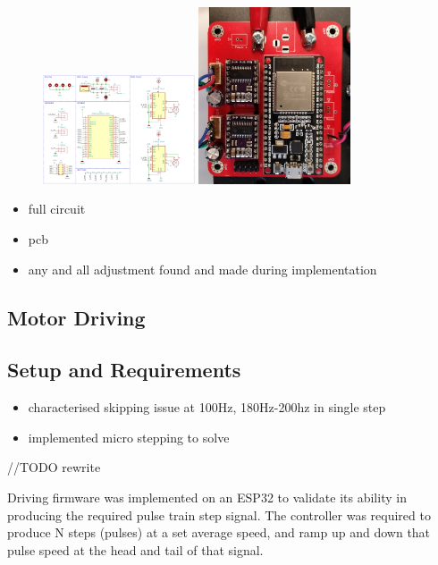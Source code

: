 \begin{figure}[h]
    \centering
    \includegraphics[width=0.4\textwidth]{img/schem.png}
    \includegraphics[width=0.4\textwidth]{img/control_pcb.jpg}
\end{figure}

\begin{itemize}
    \item full circuit
    \item pcb
    \item any and all adjustment found and made during implementation
\end{itemize}

\subsection{Motor Driving}

\subsection{Setup and Requirements}

\begin{itemize}
    \item characterised skipping issue at 100Hz, 180Hz-200hz in single step
    \item implemented micro stepping to solve
\end{itemize}

//TODO rewrite

Driving firmware was implemented on an ESP32 to validate its ability in producing the required pulse train step signal. The controller was required to produce N steps (pulses) at a set average speed, and ramp up and down that pulse speed at the head and tail of that signal.

